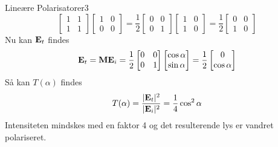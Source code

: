 \begin{opgave}{Lineære Polarisatorer}{3}
$$\begin{bmatrix}
1&1\\1&1
\end{bmatrix}
\begin{bmatrix}
1&0\\0&0
\end{bmatrix}
=
\frac{1}{2}
\begin{bmatrix}
0&0\\0&1
\end{bmatrix}
\begin{bmatrix}
1&0\\1&0
\end{bmatrix}
=
\frac{1}{2}
\begin{bmatrix}
0&0\\1&0
\end{bmatrix}
$$
Nu kan $\mathbf{E}_t$ findes
$$
\mathbf{E}_t = \mathbf{M} \mathbf{E}_i = \frac{1}{2}\begin{bmatrix}
0&0\\0&1
\end{bmatrix}
\begin{bmatrix} \cos\alpha \\ \sin\alpha \end{bmatrix}
=
\frac{1}{2}\begin{bmatrix} 0 \\ \cos\alpha \end{bmatrix}
$$
Så kan $T(\alpha)$ findes
$$
T(\alpha) = \frac{|\mathbf{E}_t|^2}{|\mathbf{E}_i|^2}=\frac{1}{4}\cos^2\alpha
$$
Intensiteten mindskes med en faktor 4 og det resulterende lys er vandret polariseret.
\end{opgave}

